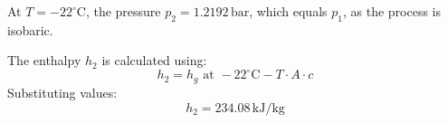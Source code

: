 At \( T = -22^\circ\text{C} \), the pressure \( p_2 = 1.2192 \, \text{bar} \), which equals \( p_1 \), as the process is isobaric.  

The enthalpy \( h_2 \) is calculated using:  
\[
h_2 = h_g \text{ at } -22^\circ\text{C} - T \cdot A \cdot c
\]  
Substituting values:  
\[
h_2 = 234.08 \, \text{kJ/kg}
\]